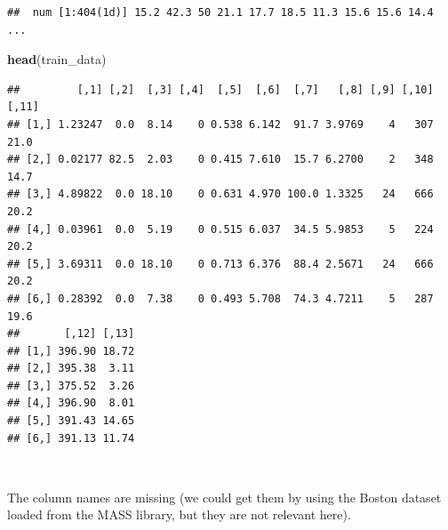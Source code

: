 \documentclass[10pt,ignorenonframetext,]{beamer}
\newenvironment{Shaded}{\begin{snugshade}}{\end{snugshade}}
\newcommand{\KeywordTok}[1]{\textcolor[rgb]{0.13,0.29,0.53}{\textbf{#1}}}
\newcommand{\NormalTok}[1]{#1}
\newcommand{\OperatorTok}[1]{\textcolor[rgb]{0.81,0.36,0.00}{\textbf{#1}}}
\newcommand{\StringTok}[1]{\textcolor[rgb]{0.31,0.60,0.02}{#1}}
\begin{document}
\begin{frame}[fragile]

\scriptsize

\begin{Shaded}
\end{Shaded}

\begin{verbatim}
##  num [1:404(1d)] 15.2 42.3 50 21.1 17.7 18.5 11.3 15.6 15.6 14.4 ...
\end{verbatim}

\begin{Shaded}
\begin{Highlighting}[]
\KeywordTok{head}\NormalTok{(train_data)}
\end{Highlighting}
\end{Shaded}

\begin{verbatim}
##         [,1] [,2]  [,3] [,4]  [,5]  [,6]  [,7]   [,8] [,9] [,10] [,11]
## [1,] 1.23247  0.0  8.14    0 0.538 6.142  91.7 3.9769    4   307  21.0
## [2,] 0.02177 82.5  2.03    0 0.415 7.610  15.7 6.2700    2   348  14.7
## [3,] 4.89822  0.0 18.10    0 0.631 4.970 100.0 1.3325   24   666  20.2
## [4,] 0.03961  0.0  5.19    0 0.515 6.037  34.5 5.9853    5   224  20.2
## [5,] 3.69311  0.0 18.10    0 0.713 6.376  88.4 2.5671   24   666  20.2
## [6,] 0.28392  0.0  7.38    0 0.493 5.708  74.3 4.7211    5   287  19.6
##       [,12] [,13]
## [1,] 396.90 18.72
## [2,] 395.38  3.11
## [3,] 375.52  3.26
## [4,] 396.90  8.01
## [5,] 391.43 14.65
## [6,] 391.13 11.74
\end{verbatim}

\(~\)

\normalsize

The column names are missing (we could get them by using the Boston
dataset loaded from the MASS library, but they are not relevant here).

\end{frame}
\end{document}

